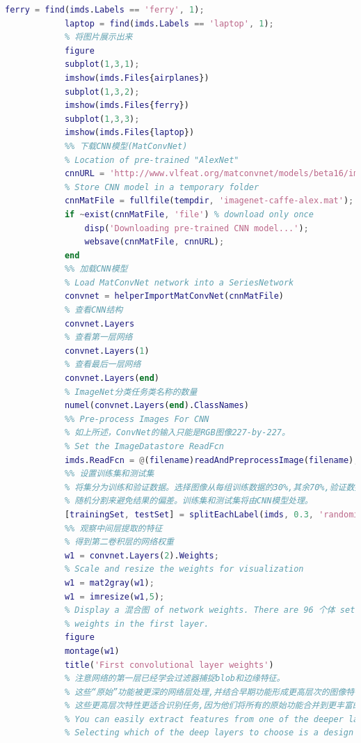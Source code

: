 \begin{lstlisting}[language = Matlab]
            ferry = find(imds.Labels == 'ferry', 1);
            laptop = find(imds.Labels == 'laptop', 1);
            % 将图片展示出来
            figure
            subplot(1,3,1);
            imshow(imds.Files{airplanes})
            subplot(1,3,2);
            imshow(imds.Files{ferry})
            subplot(1,3,3);
            imshow(imds.Files{laptop})
            %% 下载CNN模型(MatConvNet)
            % Location of pre-trained "AlexNet"
            cnnURL = 'http://www.vlfeat.org/matconvnet/models/beta16/imagenet-caffe-alex.mat';
            % Store CNN model in a temporary folder
            cnnMatFile = fullfile(tempdir, 'imagenet-caffe-alex.mat');
            if ~exist(cnnMatFile, 'file') % download only once
                disp('Downloading pre-trained CNN model...');
                websave(cnnMatFile, cnnURL);
            end
            %% 加载CNN模型
            % Load MatConvNet network into a SeriesNetwork
            convnet = helperImportMatConvNet(cnnMatFile)
            % 查看CNN结构
            convnet.Layers
            % 查看第一层网络
            convnet.Layers(1)
            % 查看最后一层网络
            convnet.Layers(end)
            % ImageNet分类任务类名称的数量
            numel(convnet.Layers(end).ClassNames)
            %% Pre-process Images For CNN
            % 如上所述，ConvNet的输入只能是RGB图像227-by-227。
            % Set the ImageDatastore ReadFcn
            imds.ReadFcn = @(filename)readAndPreprocessImage(filename);
            %% 设置训练集和测试集
            % 将集分为训练和验证数据。选择图像从每组训练数据的30%,其余70%,验证数据。
            % 随机分割来避免结果的偏差。训练集和测试集将由CNN模型处理。
            [trainingSet, testSet] = splitEachLabel(imds, 0.3, 'randomize');
            %% 观察中间层提取的特征
            % 得到第二卷积层的网络权重
            w1 = convnet.Layers(2).Weights;
            % Scale and resize the weights for visualization
            w1 = mat2gray(w1);
            w1 = imresize(w1,5);
            % Display a 混合图 of network weights. There are 96 个体 sets of
            % weights in the first layer.
            figure
            montage(w1)
            title('First convolutional layer weights')
            % 注意网络的第一层已经学会过滤器捕捉blob和边缘特征。
            % 这些“原始”功能被更深的网络层处理,并结合早期功能形成更高层次的图像特征。
            % 这些更高层次特性更适合识别任务,因为他们将所有的原始功能合并到更丰富的图像表示
            % You can easily extract features from one of the deeper layers using the activations method.
            % Selecting which of the deep layers to choose is a design choice,

\end{lstlisting}
